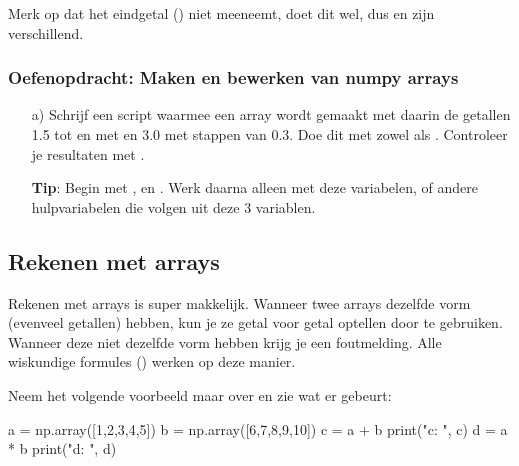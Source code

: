 \documentclass[a4paper,11pt, fleqn]{article}
\begin{document}

Merk op dat  het eindgetal () niet meeneemt,  doet dit wel, dus  en  zijn verschillend. 

\subsubsection*{Oefenopdracht: Maken en bewerken van numpy arrays}
\begin{itemize}
	\item[a)] Schrijf een script waarmee een array wordt gemaakt met daarin de getallen 1.5 tot en met en 3.0 met stappen van 0.3. Doe dit met zowel  als . Controleer je resultaten met .
	
	{\bf Tip}: Begin met ,  en . Werk daarna alleen met deze variabelen, of andere hulpvariabelen die volgen uit deze 3 variablen.
	
\end{itemize}

\subsection{Rekenen met arrays}
Rekenen met arrays is super makkelijk. Wanneer twee arrays dezelfde vorm (evenveel getallen) hebben, kun je ze getal voor getal optellen door \pythoninline{+} te gebruiken. Wanneer deze niet dezelfde vorm hebben krijg je een foutmelding. Alle wiskundige formules (\pythoninline{+,-,/,*,**}) werken op deze manier.

Neem het volgende voorbeeld maar over en zie wat er gebeurt:
\begin{python}
a = np.array([1,2,3,4,5])
b = np.array([6,7,8,9,10])
c = a + b
print("c: ", c)
d = a * b
print("d: ", d)
\end{python}
\end{document}
